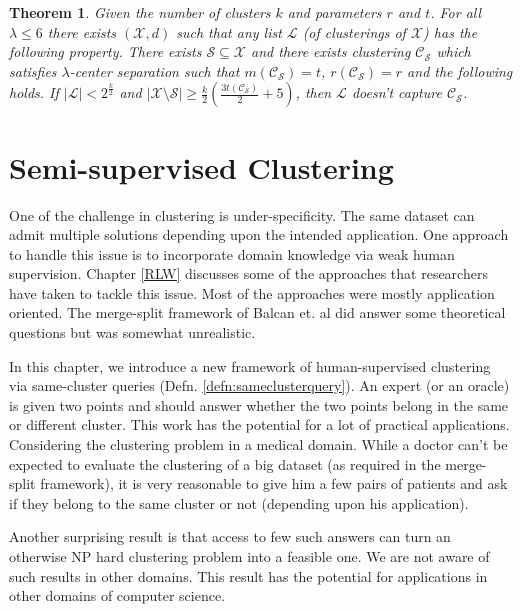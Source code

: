 \documentclass[letterpaper,12pt,titlepage,oneside,final]{book}
\newtheorem{theorem}{Theorem}
\newcommand{\mc}{\mathcal}
\begin{document}
\begin{theorem}
\label{thm:nosparselistlambdacs}
Given the number of clusters $k$ and parameters $r$ and $t$. For all $\lambda \le 6$ there exists $(\mc X, d)$ such that any list $\mc L$ (of clusterings of $\mc X$) has the following property. There exists $\mc S \subseteq \mc X$ and there exists clustering $\mc C_{\mc S}$ which satisfies $\lambda$-center separation such that $m(\mc C_{\mc S}) = t$, $r(\mc C_{\mc S}) = r$ and the following holds. If $|\mc L| < 2^{\frac{k}{2}}$ and $|\mc X \setminus \mc S|\ge \frac{k}{2}(\frac{3t(\mc C_{\mc S})}{2}+5)$, then $\mc L$ doesn't capture $\mc C_{\mc S}$.
\end{theorem}










\chapter{Semi-supervised Clustering}
\label{SSC}
One of the challenge in clustering is under-specificity. The same dataset can admit multiple solutions depending upon the intended application. One approach to handle this issue is to incorporate domain knowledge via weak human supervision. Chapter \ref{RLW} discusses some of the approaches that researchers have taken to tackle this issue. Most of the approaches were mostly application oriented. The merge-split framework of Balcan et. al \cite{balcan2008clustering} did answer some theoretical questions but was somewhat unrealistic.

In this chapter, we introduce a new framework of human-supervised clustering via same-cluster queries (Defn. \ref{defn:sameclusterquery}). An expert (or an oracle) is given two points and should answer whether the two points belong in the same or different cluster. This work has the potential for a lot of practical applications. Considering the clustering problem in a medical domain. While a doctor can't be expected to evaluate the clustering of a big dataset (as required in the merge-split framework), it is very reasonable to give him a few pairs of patients and ask if they belong to the same cluster or not (depending upon his application).

Another surprising result is that access to few such answers can turn an otherwise NP hard clustering problem into a feasible one. We are not aware of such results in other domains. This result has the potential for applications in other domains of computer science. 
\end{document}

